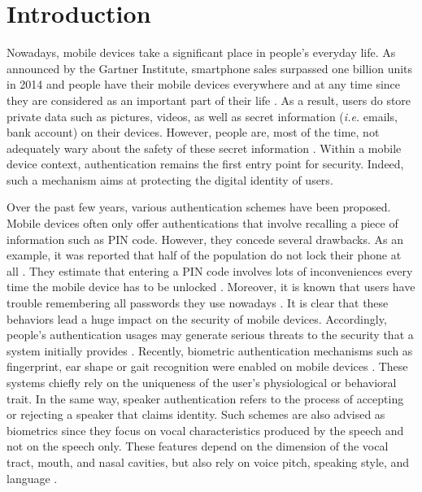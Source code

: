 \documentclass[cryptography,article,submit,moreauthors,pdftex,10pt,a4paper]{mdpi}
\begin{document}


\section{Introduction}

Nowadays, mobile devices take a significant place in people\textquoteright s everyday life. As announced by the Gartner Institute, smartphone sales surpassed one billion units in 2014 \cite{1} and people have their mobile devices everywhere and at any time \cite{2} since they are considered as an important part of their life \cite{3}. As a result, users do store private data such as pictures, videos, as well as secret information (\textit{i.e.} emails, bank account) on their devices. However, people are, most of the time, not adequately wary about the safety of these secret information \cite{4}. Within a mobile device context, authentication remains the first entry point for security. Indeed, such a mechanism aims at protecting the digital identity of users.

Over the past few years, various authentication schemes have been proposed. Mobile devices often only offer authentications that involve recalling a piece of information such as PIN code. However, they concede several drawbacks. As an example, it was reported that half of the population do not lock their phone at all \cite{5}. They estimate that entering a PIN code involves lots of inconveniences every time the mobile device has to be unlocked \cite{5}. Moreover, it is known that users have trouble remembering all passwords they use nowadays \cite{6}. It is clear that these behaviors lead a huge impact on the security of mobile devices. Accordingly, people\textquoteright s authentication usages may generate serious threats to the security that a system initially provides \cite{7,8,9}. Recently, biometric authentication mechanisms such as fingerprint, ear shape or gait recognition were enabled on mobile devices \cite{10,11,12,13}. These systems chiefly rely on the uniqueness of the user\textquoteright s physiological or behavioral trait. In the same way, speaker authentication refers to the process of accepting or rejecting a speaker that claims identity. Such schemes are also advised as biometrics since they focus on vocal characteristics produced by the speech and not on the speech only. These features depend on the dimension of the vocal tract, mouth, and nasal cavities, but also rely on voice pitch, speaking style, and language \cite{14}.
\end{document}
